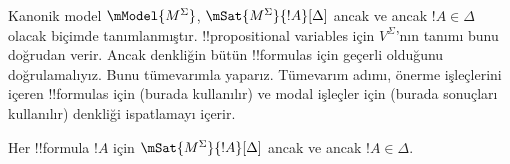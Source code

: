 \documentclass[../../../include/open-logic-section]{subfiles}
\begin{document}


Kanonik model $\mModel{M^\Sigma}$, $\mSat{M^\Sigma}{!A}[\Delta]$ ancak ve
ancak $!A\in\Delta$ olacak biçimde tanımlanmıştır. !!{propositional
variable}s için $V^\Sigma$'nın tanımı bunu doğrudan verir. Ancak denkliğin
bütün !!{formula}s için geçerli olduğunu doğrulamalıyız. Bunu tümevarımla
yaparız. Tümevarım adımı, önerme işleçlerini içeren !!{formula}s için
(burada  kullanılır) ve modal işleçler için
(burada  sonuçları kullanılır)
denkliği ispatlamayı içerir.

\begin{prop}
  Her !!{formula} $!A$ için $\mSat{M^\Sigma}{!A}[\Delta]$ ancak ve ancak
  $!A\in\Delta$.
\end{prop}
\end{document}
